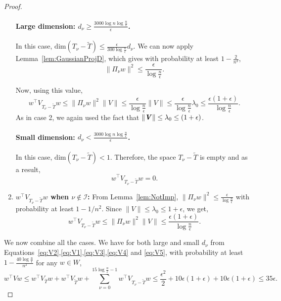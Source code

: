 \documentclass[11pt]{article}
\def\dim#1{\mathrm{dim} (#1)}
\newcommand\ww{\boldsymbol{\mathit{w}}}
\newcommand\WW{\boldsymbol{\mathit{W}}}
\newcommand\VV{\boldsymbol{\mathit{V}}}
\begin{document}
\begin{proof}
\begin{enumerate}
    \paragraph{Large dimension: $d_{\nu}\geq \frac{3000\log n\log\frac{n}{\epsilon}}{\epsilon}$.}
    In this case, $\dim{T_{\nu} -\tilde{T}} \leq \frac{\epsilon}{300\log\frac{n}{\epsilon}} d_{\nu}$. We can now apply Lemma~\ref{lem:GaussianProjD}, which gives with probability at least $1-\frac{2}{n^2}$,
    \[
\|\Pi_{\nu}\ww\|^2 \leq \frac{\epsilon}{\log\frac{n}{\epsilon}}.
    \]

    Now, using this value,
    \begin{equation}\label{eq:V3}
    \ww^{\top}\VV_{T_{\nu} -\tilde{T}}\ww \leq \|\Pi_{\nu}\ww\|^2 \|\VV\| \leq \frac{\epsilon}{\log\frac{n}{\epsilon}} \|\VV\|\leq  \frac{\epsilon}{\log\frac{n}{\epsilon}} \lambda_0 \leq  \frac{\epsilon(1+\epsilon)}{\log\frac{n}{\epsilon}}.
    \end{equation}
    As in case 2, we again used the fact that $\|\VV\| \le \lambda_0 \le (1+\eps)$.
    \paragraph{Small dimension: $d_{\nu}<\frac{3000\log n\log\frac{n}{\epsilon}}{\epsilon}$.}
    In this case, $\dim{T_{\nu} -\tilde{T}}<1.$ Therefore, the space $T_{\nu} -\tilde{T}$ is empty and as a result, 
    \begin{equation}\label{eq:V4}
    \ww^{\top}\VV_{T_{\nu} -\tilde{T}}\ww  = 0.
    \end{equation}
\item \textbf{$\ww^\top\VV_{T_{\nu} -\tilde{T}}\ww$ when $\nu \notin \mathcal{I}$:}
From Lemma~\ref{lem:NotImp}, $\|\Pi_{\nu}\ww\|^2 \leq \frac{\epsilon}{\log\frac{n}{\epsilon}}$ with probability at least $1-1/n^2$. Since $\|\VV\|\leq \lambda_0\leq 1+\epsilon$, we get,
\begin{equation}\label{eq:V5}
\ww^{\top}\VV_{T_{\nu} -\tilde{T}}\ww \leq \|\Pi_{\nu}\ww\|^2 \|\VV\| \le \frac{\epsilon(1+\epsilon)}{\log\frac{n}{\epsilon}}.
\end{equation}
\end{enumerate}
We now combine all the cases. We have for both large and small $d_{\nu}$ from Equations~\eqref{eq:V2},\eqref{eq:V1},\eqref{eq:V3},\eqref{eq:V4} and \eqref{eq:V5}, with probability at least $1-\frac{40\log\frac{n}{\epsilon}}{n^2}$ for any $\ww\in \WW$,
\[
\ww^{\top}\VV\ww \leq \ww^{\top}\VV_{\overline{T}}\ww + \ww^{\top}\VV_{\tilde{T}}\ww + \sum_{\nu = 0}^{15\log\frac{n}{\epsilon}-1}\ww^{\top}\VV_{T_{\nu} -\tilde{T}}\ww \leq \frac{\epsilon^2}{2} + 10\epsilon(1+\epsilon) + 10\epsilon(1+\epsilon) \leq 35\epsilon.
\]

\end{proof}
\end{document}
